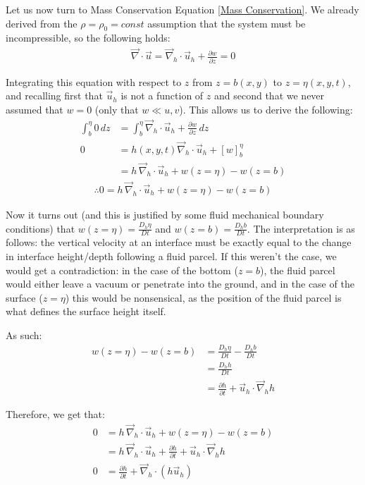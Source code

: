 Let us now turn to Mass Conservation Equation \ref{Mass Conservation}. We already derived from the \(\rho=\rho_0=const\) assumption that the system must be incompressible, so the following holds:
\begin{align*}
    \vec{\nabla}\cdot\vec{u}=\vec{\nabla}_h\cdot\vec{u}_h+\frac{\partial w}{\partial z}=0
\end{align*}

Integrating this equation with respect to \(z\) from \(z=b(x,y)\) to \(z=\eta(x,y,t)\), and recalling first that \(\vec{u}_h\) is not a function of \(z\) and second that we never assumed that \(w=0\) (only that \(w \ll u,v\)). This allows us to derive the following:
\begin{align*}
    \int_{b}^{\eta} 0 \,dz &= \int_{b}^{\eta} \vec{\nabla}_h\cdot\vec{u}_h+\frac{\partial w}{\partial z}\, dz\\
    0&=h(x,y,t)\vec{\nabla}_h\cdot\vec{u}_h+\left[ w \right]_b^\eta\\
    &=h\,\vec{\nabla}_h\cdot\vec{u}_h + w(z=\eta)-w(z=b)
\end{align*}
\begin{align*}
    \therefore \boxed{0 = h\,\vec{\nabla}_h\cdot\vec{u}_h + w(z=\eta)-w(z=b)}
\end{align*}

Now it turns out (and this is justified by some fluid mechanical boundary conditions) that \(w(z=\eta)=\frac{D_h \eta}{Dt}\) and \(w(z=b)=\frac{D_h b}{Dt}\). The interpretation is as follows: the vertical velocity at an interface must be exactly equal to the change in interface height/depth following a fluid parcel. If this weren't the case, we would get a contradiction: in the case of the bottom (\(z=b\)), the fluid parcel would either leave a vacuum or penetrate into the ground, and in the case of the surface (\(z=\eta\)) this would be nonsensical, as the position of the fluid parcel is what defines the surface height itself.

As such:
\begin{align*}
    w(z=\eta)-w(z=b)&=\frac{D_h \eta}{Dt}-\frac{D_h b}{Dt}\\
    &=\frac{D_h h}{Dt}\\
    &=\frac{\partial h}{\partial t}+ \vec{u}_h\cdot\vec{\nabla}_hh
\end{align*}

Therefore, we get that:
\begin{align*}
    0&=h\,\vec{\nabla}_h\cdot\vec{u}_h + w(z=\eta)-w(z=b)\\
    &=h\,\vec{\nabla}_h\cdot\vec{u}_h+\frac{\partial h}{\partial t}+ \vec{u}_h\cdot\vec{\nabla}_hh\\
    0&=\frac{\partial h}{\partial t}+\vec{\nabla}_h\cdot(h\vec{u}_h)
\end{align*}

